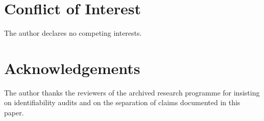 \documentclass[11pt]{article}
\begin{document}
\section*{Conflict of Interest}
The author declares no competing interests.

\section*{Acknowledgements}
The author thanks the reviewers of the archived research programme for
insisting on identifiability audits and on the separation of claims
documented in this paper.




\appendix








\end{document}
